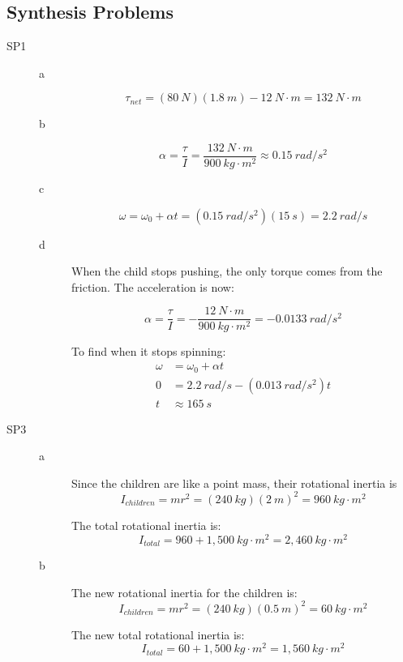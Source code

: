 \documentclass{exam}
\begin{document}
\subsection{Synthesis Problems}

\begin{description}
\item[SP1]
\begin{description}

\item[a]
\[
  \tau_{net} = (80 \ N)(1.8 \ m) - 12 \ N \cdot m = 132 \ N \cdot m
\]

\item[b]
\[
  \alpha = \frac{\tau}{I} = \frac{132 \ N \cdot m}{900 \ kg \cdot m^2} \approx 0.15 \ rad/s^2
\]

\item[c]
\[
  \omega = \omega_0 + \alpha t = (0.15 \ rad/s^2)(15 \ s) = 2.2 \ rad/s
\]

\item[d]
When the child stops pushing, the only torque comes from the friction.  The acceleration is now:

\[
  \alpha = \frac{\tau}{I} = - \frac{12 \ N \cdot m}{900 \ kg \cdot m^2} = -0.0133 \ rad/s^2
\]

To find when it stops spinning:
\begin{align*}
  \omega &= \omega_0 + \alpha t \\
  0 &= 2.2 \ rad/s - (0.013 \ rad/s^2) t \\
  t &\approx 165 \ s
\end{align*}

\end{description}

\item[SP3]

\begin{description}
\item[a]
Since the children are like a point mass, their rotational inertia is
\[
  I_{children} = mr^2 = (240 \ kg)(2 \ m)^2 = 960 \ kg \cdot m^2
\]

The total rotational inertia is:
\[
  I_{total} = 960 + 1,500 \ kg \cdot m^2 = 2,460 \ kg \cdot m^2
\]

\item[b]
The new rotational inertia for the children is:
\[
  I_{children} = mr^2 = (240 \ kg)(0.5 \ m)^2 = 60 \ kg \cdot m^2
\]

The new total rotational inertia is:
\[
  I_{total} = 60 + 1,500 \ kg \cdot m^2 = 1,560 \ kg \cdot m^2
\]


\end{description}
\end{description}
\end{document}
